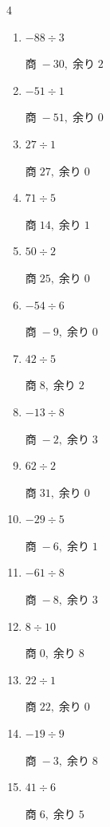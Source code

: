 \begin{multicols}{4}
\begin{enumerate}
  \item $-88 \div 3$

        $商\; -30,\; 余り\; 2$

  \item $-51 \div 1$

        $商\; -51,\; 余り\; 0$

  \item $27 \div 1$

        $商\; 27,\; 余り\; 0$

  \item $71 \div 5$

        $商\; 14,\; 余り\; 1$

\columnbreak %

  \item $50 \div 2$

        $商\; 25,\; 余り\; 0$

  \item $-54 \div 6$

        $商\; -9,\; 余り\; 0$

  \item $42 \div 5$

        $商\; 8,\; 余り\; 2$

  \item $-13 \div 8$

        $商\; -2,\; 余り\; 3$

  \item $62 \div 2$

        $商\; 31,\; 余り\; 0$

  \item $-29 \div 5$

        $商\; -6,\; 余り\; 1$

  \item $-61 \div 8$

        $商\; -8,\; 余り\; 3$

  \item $8 \div 10$

        $商\; 0,\; 余り\; 8$

  \item $22 \div 1$

        $商\; 22,\; 余り\; 0$

  \item $-19 \div 9$

        $商\; -3,\; 余り\; 8$

  \item $41 \div 6$

        $商\; 6,\; 余り\; 5$


\end{enumerate}
\end{multicols}
